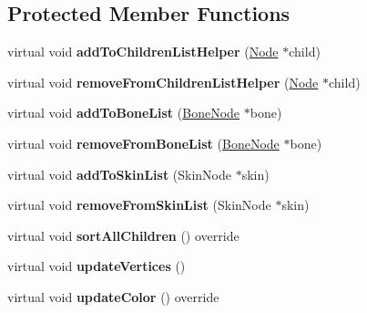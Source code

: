 \subsection*{Protected Member Functions}
\begin{DoxyCompactItemize}
\item 
\mbox{\label{classBoneNode_aeecc3a545baf072c97c922d321d40e34}} 
virtual void {\bfseries add\+To\+Children\+List\+Helper} (\hyperlink{classNode}{Node} $\ast$child)
\item 
\mbox{\label{classBoneNode_a6b3cbd3f38a687c4d24f01fbf6d96f74}} 
virtual void {\bfseries remove\+From\+Children\+List\+Helper} (\hyperlink{classNode}{Node} $\ast$child)
\item 
\mbox{\label{classBoneNode_af64871c89929df3c968026f20be84903}} 
virtual void {\bfseries add\+To\+Bone\+List} (\hyperlink{classBoneNode}{Bone\+Node} $\ast$bone)
\item 
\mbox{\label{classBoneNode_ad03e440346786f31176b59e7bf8c20cb}} 
virtual void {\bfseries remove\+From\+Bone\+List} (\hyperlink{classBoneNode}{Bone\+Node} $\ast$bone)
\item 
\mbox{\label{classBoneNode_a01b3936124e3d7fa37571834685f24d8}} 
virtual void {\bfseries add\+To\+Skin\+List} (Skin\+Node $\ast$skin)
\item 
\mbox{\label{classBoneNode_ac9e2e4d0309e8eadbf8547bd0057d441}} 
virtual void {\bfseries remove\+From\+Skin\+List} (Skin\+Node $\ast$skin)
\item 
\mbox{\label{classBoneNode_a6faed38f8b2493261a280b91df1686e0}} 
virtual void {\bfseries sort\+All\+Children} () override
\item 
\mbox{\label{classBoneNode_aa24592cc9ff8008a4e0d2fcd52fc6bb3}} 
virtual void {\bfseries update\+Vertices} ()
\item 
\mbox{\label{classBoneNode_a0f1b6630385571f4b99595ea0a6f5d57}} 
virtual void {\bfseries update\+Color} () override
\item 
\mbox{\label{classBoneNode_a8161702220472c2f33844e2f06546191}} 

\end{DoxyCompactItemize}
